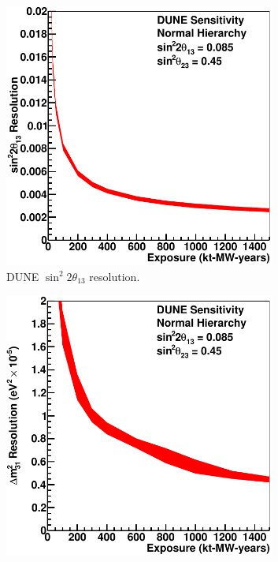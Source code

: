 \begin{figure}
  \centering
  \begin{subfigure}[t]{0.48\linewidth}
    \centering
    \includegraphics[width=0.98\textwidth]{DUNETheta13Resolution.pdf}
    \caption{DUNE $\sin^2{2\theta_{13}}$ resolution.}
    \label{fig:DUNETheta13Resolution}
  \end{subfigure}
  \hfill
  \begin{subfigure}[t]{0.48\linewidth}
    \centering
    \includegraphics[width=0.98\textwidth]{DUNEDeltaM31Resolution.pdf}

\end{subfigure}
\end{figure}
